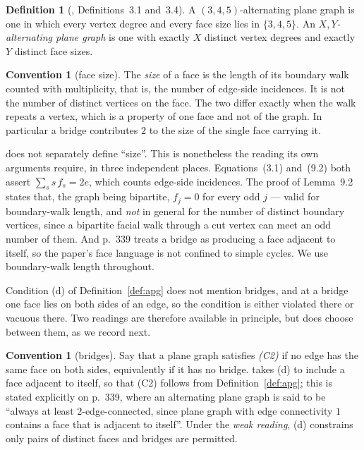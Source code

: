 \documentclass[11pt,a4paper]{amsart}
\theoremstyle{plain}
\theoremstyle{definition}
\newtheorem{definition}[theorem]{Definition}
\newtheorem{convention}[theorem]{Convention}
\begin{document}
\begin{definition}[\cite{AHSSV2015}, Definitions~3.1 and~3.4]
A $(3,4,5)$-alternating plane graph is one in which every vertex degree and
every face size lies in $\{3,4,5\}$. An \emph{$X,Y$-alternating plane graph} is
one with exactly $X$ distinct vertex degrees and exactly $Y$ distinct face
sizes.
\end{definition}

\begin{convention}[face size]\label{conv:c1}
The \emph{size} of a face is the length of its boundary walk counted with
multiplicity, that is, the number of edge-side incidences. It is not the number
of distinct vertices on the face. The two differ exactly when the walk repeats a
vertex, which is a property of one face and not of the graph. In particular a
bridge contributes $2$ to the size of the single face carrying it.

\cite{AHSSV2015} does not separately define ``size''. This is nonetheless the
reading its own arguments require, in three independent places. Equations~(3.1)
and~(9.2) both assert $\sum_s s\,f_s = 2e$, which counts edge-side incidences.
The proof of Lemma~9.2 states that, the graph being bipartite, $f_j = 0$ for
every odd $j$ --- valid for boundary-walk length, and \emph{not} in general for
the number of distinct boundary vertices, since a bipartite facial walk through
a cut vertex can meet an odd number of them. And p.~339 treats a bridge as
producing a face adjacent to itself, so the paper's face language is not
confined to simple cycles. We use boundary-walk length throughout.
\end{convention}

Condition (d) of Definition~\ref{def:apg} does not mention bridges, and at a
bridge one face lies on both sides of an edge, so the condition is either
violated there or vacuous there. Two readings are therefore available in
principle, but \cite{AHSSV2015} does choose between them, as we record next.

\begin{convention}[bridges]\label{conv:c2}
Say that a plane graph satisfies \emph{(C2)} if no edge has the same face on
both sides, equivalently if it has no bridge. \cite{AHSSV2015} takes (d) to
include a face adjacent to itself, so that (C2) follows from
Definition~\ref{def:apg}; this is stated explicitly on p.~339, where an
alternating plane graph is said to be ``always at least $2$-edge-connected,
since plane graph with edge connectivity $1$ contains a face that is adjacent to
itself''. Under the \emph{weak reading}, (d) constrains only pairs of distinct
faces and bridges are permitted.
\end{convention}
\end{document}
